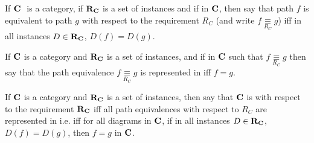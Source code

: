 \newcommand{\pequiv}[1][R_C]{\underset{#1}{\equiv}}

\begin{definition}
If $\textbf{C}\ $ is a  category, if $\textbf{R}_{\textbf{C}}$ is a set of instances
 and if \fgparalleldiag in $\textbf{C}$, then say that path $f$ is equivalent to path $g$ with respect to the requirement $R_C$ 
 (and write $f \pequiv g$) iff
in all instances $D \in \textbf{R}_{\textbf{C}}$, $D(f)=D(g)$.
\end{definition}

\begin{definition}
If $\textbf{C}$ is a  category and $\textbf{R}_{\textbf{C}}$ is a set of instances,
 and if \fgparalleldiag in $\textbf{C}$ such that $f \pequiv g$
 then say that the path equivalence $f \pequiv g$ is represented in \catcw iff
 $f=g$.
\end{definition}

\begin{oldtt}
\begin{definition}
If $\textbf{C}$ is a  category and $\textbf{R}_{\textbf{C}}$ is a set of instances,
 then say that  $\textbf{C}$ is  with respect 
to the requirement $\textbf{R}_{\textbf{C}}$ iff all path equivalences with respect to $R_C$ are represented in \catcw 
i.e. iff for all diagrams \fgparalleldiag in $\textbf{C}$,  
if in all instances $D \in \textbf{R}_{\textbf{C}}$, $D(f)=D(g)$,  then $f=g$ in $\textbf{C}$.
\end{definition}
\end{oldtt}